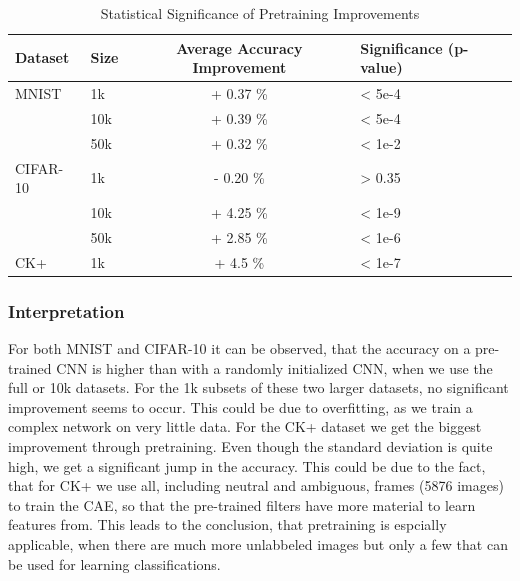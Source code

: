 \documentclass{article}
\begin{document}
    \begin{table}
      \caption{Statistical Significance of Pretraining Improvements}
      \label{table:significance}
      \centering
      \begin{tabular}{llcl}
        \toprule
        Dataset     & Size    & Average Accuracy Improvement & Significance (p-value) \\
        \midrule
        MNIST & 1k    & + 0.37 \%  & < 5e-4 \\
              & 10k   & + 0.39 \%  & < 5e-4 \\
              & 50k   & + 0.32 \%  & < 1e-2 \\
        \midrule
        CIFAR-10  & 1k    & - 0.20 \% & > 0.35\\
                  & 10k   & + 4.25 \% & < 1e-9\\
                  & 50k   & + 2.85 \% & < 1e-6\\
        \midrule
        CK+     & 1k & + 4.5 \%      & < 1e-7 \\
        \bottomrule
      \end{tabular}
    \end{table}

    \subsubsection{Interpretation}
      For both MNIST and CIFAR-10 it can be observed, that the accuracy on a pre-trained CNN is higher than with a randomly initialized CNN, when we use the full or 10k datasets.
      For the 1k subsets of these two larger datasets, no significant improvement seems to occur. This could be due to overfitting, as we train a complex network on very little data.
      For the CK+ dataset we get the biggest improvement through pretraining.
      Even though the standard deviation is quite high, we get a significant jump in the accuracy.
      This could be due to the fact, that for CK+ we use all, including neutral and ambiguous, frames (5876 images) to train the CAE, so that the pre-trained filters have more material to learn features from.
      This leads to the conclusion, that pretraining is espcially applicable, when there are much more unlabbeled images but only a few that can be used for learning classifications.
\end{document}
